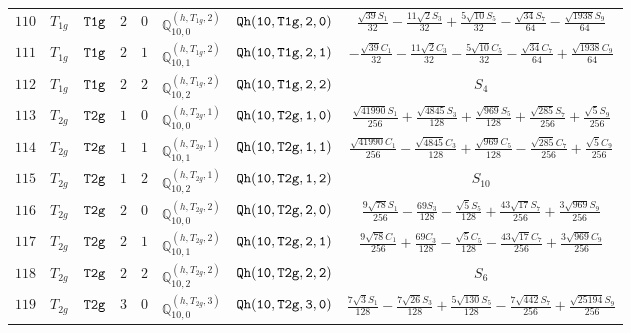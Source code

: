 \documentclass[fleqn,8pt]{jsarticle}
\begin{document}
\begin{table}[ht!]
\begin{center}
\begin{tabular}{cccccccc}
$ 110 $ & $ T_{1g} $ & $ {\tt T1g} $ & $ 2 $ & $ 0 $ & $ \mathbb{Q}_{10,0}^{(h,T_{1g},2)} $ & $ {\tt Qh(10,T1g,2,0)} $ & $ \frac{\sqrt{39} S_{1}}{32} - \frac{11 \sqrt{2} S_{3}}{32} + \frac{5 \sqrt{10} S_{5}}{32} - \frac{\sqrt{34} S_{7}}{64} - \frac{\sqrt{1938} S_{9}}{64} $ \\
$ 111 $ & $ T_{1g} $ & $ {\tt T1g} $ & $ 2 $ & $ 1 $ & $ \mathbb{Q}_{10,1}^{(h,T_{1g},2)} $ & $ {\tt Qh(10,T1g,2,1)} $ & $ - \frac{\sqrt{39} C_{1}}{32} - \frac{11 \sqrt{2} C_{3}}{32} - \frac{5 \sqrt{10} C_{5}}{32} - \frac{\sqrt{34} C_{7}}{64} + \frac{\sqrt{1938} C_{9}}{64} $ \\
$ 112 $ & $ T_{1g} $ & $ {\tt T1g} $ & $ 2 $ & $ 2 $ & $ \mathbb{Q}_{10,2}^{(h,T_{1g},2)} $ & $ {\tt Qh(10,T1g,2,2)} $ & $ S_{4} $ \\
$ 113 $ & $ T_{2g} $ & $ {\tt T2g} $ & $ 1 $ & $ 0 $ & $ \mathbb{Q}_{10,0}^{(h,T_{2g},1)} $ & $ {\tt Qh(10,T2g,1,0)} $ & $ \frac{\sqrt{41990} S_{1}}{256} + \frac{\sqrt{4845} S_{3}}{128} + \frac{\sqrt{969} S_{5}}{128} + \frac{\sqrt{285} S_{7}}{256} + \frac{\sqrt{5} S_{9}}{256} $ \\
$ 114 $ & $ T_{2g} $ & $ {\tt T2g} $ & $ 1 $ & $ 1 $ & $ \mathbb{Q}_{10,1}^{(h,T_{2g},1)} $ & $ {\tt Qh(10,T2g,1,1)} $ & $ \frac{\sqrt{41990} C_{1}}{256} - \frac{\sqrt{4845} C_{3}}{128} + \frac{\sqrt{969} C_{5}}{128} - \frac{\sqrt{285} C_{7}}{256} + \frac{\sqrt{5} C_{9}}{256} $ \\
$ 115 $ & $ T_{2g} $ & $ {\tt T2g} $ & $ 1 $ & $ 2 $ & $ \mathbb{Q}_{10,2}^{(h,T_{2g},1)} $ & $ {\tt Qh(10,T2g,1,2)} $ & $ S_{10} $ \\
$ 116 $ & $ T_{2g} $ & $ {\tt T2g} $ & $ 2 $ & $ 0 $ & $ \mathbb{Q}_{10,0}^{(h,T_{2g},2)} $ & $ {\tt Qh(10,T2g,2,0)} $ & $ \frac{9 \sqrt{78} S_{1}}{256} - \frac{69 S_{3}}{128} - \frac{\sqrt{5} S_{5}}{128} + \frac{43 \sqrt{17} S_{7}}{256} + \frac{3 \sqrt{969} S_{9}}{256} $ \\
$ 117 $ & $ T_{2g} $ & $ {\tt T2g} $ & $ 2 $ & $ 1 $ & $ \mathbb{Q}_{10,1}^{(h,T_{2g},2)} $ & $ {\tt Qh(10,T2g,2,1)} $ & $ \frac{9 \sqrt{78} C_{1}}{256} + \frac{69 C_{3}}{128} - \frac{\sqrt{5} C_{5}}{128} - \frac{43 \sqrt{17} C_{7}}{256} + \frac{3 \sqrt{969} C_{9}}{256} $ \\
$ 118 $ & $ T_{2g} $ & $ {\tt T2g} $ & $ 2 $ & $ 2 $ & $ \mathbb{Q}_{10,2}^{(h,T_{2g},2)} $ & $ {\tt Qh(10,T2g,2,2)} $ & $ S_{6} $ \\
$ 119 $ & $ T_{2g} $ & $ {\tt T2g} $ & $ 3 $ & $ 0 $ & $ \mathbb{Q}_{10,0}^{(h,T_{2g},3)} $ & $ {\tt Qh(10,T2g,3,0)} $ & $ \frac{7 \sqrt{3} S_{1}}{128} - \frac{7 \sqrt{26} S_{3}}{128} + \frac{5 \sqrt{130} S_{5}}{128} - \frac{7 \sqrt{442} S_{7}}{256} + \frac{\sqrt{25194} S_{9}}{256} $ \\

\end{tabular}
\end{center}
\end{table}
\end{document}
